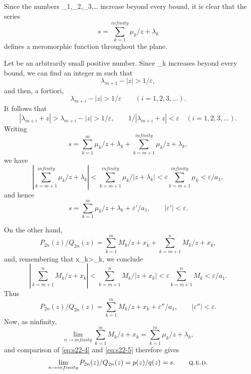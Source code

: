 \documentclass[
  paper=b5,
  fontsize=13pt,
  twoside,
  headings=normal,
  bookmarkpackage=false
]{scrartcl}
\theoremstyle{stieltjesplain}
\theoremstyle{stieltjesdefinition}
\def\({}\def\){}%
\def\frac#1#2{#1/#2}%
\def\infty{infinity}%
\begin{document}
Since the numbers \(\lambda_1,\lambda_2,\lambda_3,\ldots\) increase
beyond every bound, it is clear that the series
\[
 s=\sum_{k=1}^{\infty}\frac{\mu_k}{z+\lambda_k}
\]
defines a meromorphic function throughout the plane.

Let \(\varepsilon\) be an arbitrarily small positive number. Since
\(\lambda_k\) increases beyond every bound, we can find an integer \(m\)
such that
\[
 \lambda_{m+1}-|z|>\frac1\varepsilon,
\]
and then, a fortiori,
\[
 \lambda_{m+i}-|z|>\frac1\varepsilon
 \qquad(i=1,2,3,\ldots).
\]
It follows that
\[
 |\lambda_{m+i}+z|>\lambda_{m+i}-|z|>\frac1\varepsilon,
 \qquad
 \frac1{|\lambda_{m+i}+z|}<\varepsilon
 \quad(i=1,2,3,\ldots).
\]
Writing
\[
 s=\sum_{k=1}^{m}\frac{\mu_k}{z+\lambda_k}
   +\sum_{k=m+1}^{\infty}\frac{\mu_k}{z+\lambda_k},
\]
we have
\[
 \left|\sum_{k=m+1}^{\infty}\frac{\mu_k}{z+\lambda_k}\right|
 <\sum_{k=m+1}^{\infty}\frac{\mu_k}{|z+\lambda_k|}
 <\varepsilon\sum_{k=m+1}^{\infty}\mu_k<\frac\varepsilon{a_1},
\]
and hence
\begin{equation}
 s=\sum_{k=1}^{m}\frac{\mu_k}{z+\lambda_k}
   +\frac{\varepsilon'}{a_1},
 \qquad |\varepsilon'|<\varepsilon.
 \tag{4}\label{eq:s22-4}
\end{equation}

On the other hand,
\[
 \frac{P_{2n}(z)}{Q_{2n}(z)}
  =\sum_{k=1}^{m}\frac{M_k}{z+x_k}
   +\sum_{k=m+1}^{n}\frac{M_k}{z+x_k},
\]
and, remembering that \(x_k>\lambda_k\), we conclude
\[
 \left|\sum_{k=m+1}^{n}\frac{M_k}{z+x_k}\right|
 <\sum_{k=m+1}^{n}\frac{M_k}{|z+x_k|}
 <\varepsilon\sum_{k=m+1}^{n}M_k<\frac\varepsilon{a_1}.
\]
Thus
\begin{equation}
 \frac{P_{2n}(z)}{Q_{2n}(z)}
  =\sum_{k=1}^{m}\frac{M_k}{z+x_k}+\frac{\varepsilon''}{a_1},
 \qquad |\varepsilon''|<\varepsilon.
 \tag{5}\label{eq:s22-5}
\end{equation}
Now, as \(n\to\infty\),
\[
 \lim_{n\to\infty}\sum_{k=1}^{m}\frac{M_k}{z+x_k}
  =\sum_{k=1}^{m}\frac{\mu_k}{z+\lambda_k},
\]
and comparison of \eqref{eq:s22-4} and \eqref{eq:s22-5} therefore gives
\[
 \lim_{n\to\infty}\frac{P_{2n}(z)}{Q_{2n}(z)}
  =\frac{p(z)}{q(z)}=s.
 \qquad\text{\textsc{q.e.d.}}
\]
\end{document}
